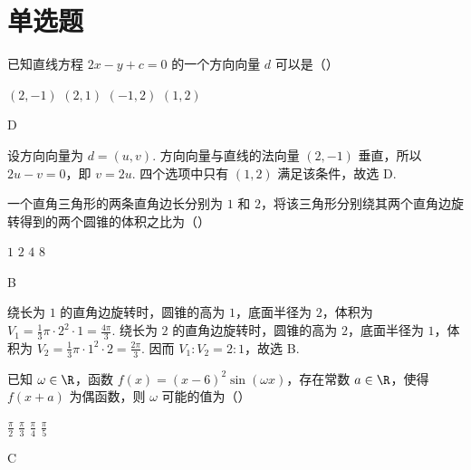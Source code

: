 \section{单选题}

\begin{problem}
已知直线方程 \(2x-y+c=0\) 的一个方向向量 \(d\) 可以是（\quad）

\choices
    {\((2,-1)\)}
    {\((2,1)\)}
    {\((-1,2)\)}
    {\((1,2)\)}
\end{problem}

\begin{answer}
D
\end{answer}

\begin{solution}
设方向向量为 \(d=(u,v)\). 方向向量与直线的法向量 \((2,-1)\) 垂直，所以 \(2u-v=0\)，即 \(v=2u\). 四个选项中只有 \((1,2)\) 满足该条件，故选 D.
\end{solution}

\begin{problem}
一个直角三角形的两条直角边长分别为 \(1\) 和 \(2\)，将该三角形分别绕其两个直角边旋转得到的两个圆锥的体积之比为（\quad）

\choices
    {\(1\)}
    {\(2\)}
    {\(4\)}
    {\(8\)}
\end{problem}

\begin{answer}
B
\end{answer}

\begin{solution}
绕长为 \(1\) 的直角边旋转时，圆锥的高为 \(1\)，底面半径为 \(2\)，体积为 \(V_1=\frac13\pi\cdot2^2\cdot1=\frac{4\pi}{3}\). 绕长为 \(2\) 的直角边旋转时，圆锥的高为 \(2\)，底面半径为 \(1\)，体积为 \(V_2=\frac13\pi\cdot1^2\cdot2=\frac{2\pi}{3}\). 因而 \(V_1:V_2=2:1\)，故选 B.
\end{solution}

\begin{problem}
已知 \(\omega\in\R\)，函数 \(f(x)=(x-6)^2\sin(\omega x)\)，存在常数 \(a\in\R\)，使得 \(f(x+a)\) 为偶函数，则 \(\omega\) 可能的值为（\quad）

\choices
    {\(\frac\pi2\)}
    {\(\frac\pi3\)}
    {\(\frac\pi4\)}
    {\(\frac\pi5\)}
\end{problem}

\begin{answer}
C
\end{answer}

